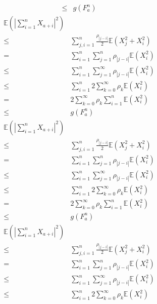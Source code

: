 \documentclass{ctexart}
\begin{document}
\begin{remark}
\begin{equation}
\begin{aligned}
      \leq & g(F_a^n)
    \end{aligned}
  \end{equation}
  \begin{equation}
    \begin{aligned}
      \mathbb{E}(|\sum_{i=1}^{n}X_{a+i}|^2) \\
      \leq & \sum_{j,i = 1}^{n} \frac{\rho_{|j-i|}}{2}\mathbb{E}(X_j^2 + X_i^2)\\
      =& \sum_{i=1}^{n} \sum_{j=1}^{n}\rho_{|j-i|}\mathbb{E}(X_i^2)\\
      \leq & \sum_{i=1}^{n} \sum_{j=1}^{\infty} \rho_{|j-i|}\mathbb{E}(X_i^2)\\
      \leq & \sum_{i=1}^{n} 2\sum_{k=0}^{\infty} \rho_k \mathbb{E}(X_i^2)\\
      =& 2\sum_{k=0}^{\infty}\rho_k  \sum_{i=1}^{n}\mathbb{E}(X_i^2)\\
      \leq & g(F_a^n)
    \end{aligned}
  \end{equation}
  \begin{equation}
    \begin{aligned}
      \mathbb{E}(|\sum_{i=1}^{n}X_{a+i}|^2) \\
      \leq & \sum_{j,i = 1}^{n} \frac{\rho_{|j-i|}}{2}\mathbb{E}(X_j^2 + X_i^2)\\
      =& \sum_{i=1}^{n} \sum_{j=1}^{n}\rho_{|j-i|}\mathbb{E}(X_i^2)\\
      \leq & \sum_{i=1}^{n} \sum_{j=1}^{\infty} \rho_{|j-i|}\mathbb{E}(X_i^2)\\
      \leq & \sum_{i=1}^{n} 2\sum_{k=0}^{\infty} \rho_k \mathbb{E}(X_i^2)\\
      =& 2\sum_{k=0}^{\infty}\rho_k  \sum_{i=1}^{n}\mathbb{E}(X_i^2)\\
      \leq & g(F_a^n)
    \end{aligned}
  \end{equation}
  \begin{equation}
    \begin{aligned}
      \mathbb{E}(|\sum_{i=1}^{n}X_{a+i}|^2) \\
      \leq & \sum_{j,i = 1}^{n} \frac{\rho_{|j-i|}}{2}\mathbb{E}(X_j^2 + X_i^2)\\
      =& \sum_{i=1}^{n} \sum_{j=1}^{n}\rho_{|j-i|}\mathbb{E}(X_i^2)\\
      \leq & \sum_{i=1}^{n} \sum_{j=1}^{\infty} \rho_{|j-i|}\mathbb{E}(X_i^2)\\
      \leq & \sum_{i=1}^{n} 2\sum_{k=0}^{\infty} \rho_k \mathbb{E}(X_i^2)\\

\end{aligned}
\end{equation}
\end{remark}
\end{document}
